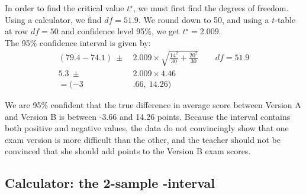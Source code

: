 \begin{examplewrap}
\begin{nexample}
\begin{description}
In order to find the critical value $t^{\star}$, we must first find the degrees of freedom.  Using a calculator, we find $df=51.9$.  We round down to 50, and using a $t$-table at row $df = 50$ and confidence level 95\%, we get $t^{\star} = 2.009$.\\

The 95\% confidence interval is given by:
\begin{align*}
(79.4 - 74.1) \ \pm\  &2.009\times \sqrt{\frac{14^2}{30} + \frac{20^2}{30}}   \qquad df = 51.9\\
5.3 \ \pm\  &2.009\times 4.46 \\
=(-3&.66,\ 14.26)
\end{align*}
\item[\inferencestep{Conclude}]  We are 95\% confident that the true difference in average score between Version A and Version B is between -3.66 and 14.26 points. Because the interval contains both positive and negative values, the data do not convincingly show that one exam version is more difficult than the other, and the teacher should not be convinced that she should add points to the Version B exam scores.

\end{description}
\end{nexample}
\end{examplewrap}


\D{\newpage}

\subsection[Calculator: the 2-sample $t$-interval]{Calculator: the 2-sample -interval}
\label{2SampTint}

